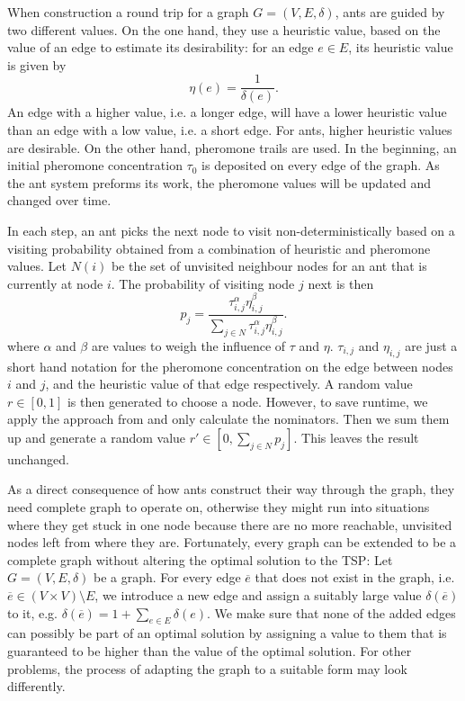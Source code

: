When construction a round trip for a graph $G = \left( V, E, \delta \right)$, ants are guided by two different values. On the one hand, they use a heuristic value, based on the value of an edge to estimate its desirability: for an edge $e \in E$, its heuristic value is given by
\begin{equation}
  \label{eqn:eta}
  \eta \left( e \right) = \frac{1}{\delta \left( e \right)}.
\end{equation}
An edge with a higher value, i.e. a longer edge, will have a lower heuristic value than an edge with a low value, i.e. a short edge. For ants, higher heuristic values are desirable. On the other hand, pheromone trails are used. In the beginning, an initial pheromone concentration $\tau_0$ is deposited on every edge of the graph. As the ant system preforms its work, the pheromone values will be updated and changed over time.

In each step, an ant picks the next node to visit non-deterministically based on a visiting probability obtained from a combination of heuristic and pheromone values. Let $N \left( i \right)$ be the set of unvisited neighbour nodes for an ant that is currently at node $i$. The probability of visiting node $j$ next is then
\begin{equation}
  \label{eqn:probability}
  p_j = \frac{\tau_{i,j}^\alpha \eta_{i,j}^\beta}{\sum_{j \in N} \tau_{i,j}^\alpha \eta_{i,j}^\beta}.
\end{equation}
where $\alpha$ and $\beta$ are values to weigh the influence of $\tau$ and $\eta$. $\tau_{i,j}$ and $\eta_{i,j}$ are just a short hand notation for the pheromone concentration on the edge between nodes $i$ and $j$, and the heuristic value of that edge respectively. A random value $r \in \left[0, 1 \right]$ is then generated to choose a node. However, to save runtime, we apply the approach from \cite{Bloecker} and only calculate the nominators. Then we sum them up and generate a random value $r' \in \left[0, \sum_{j \in N} p_j \right]$. This leaves the result unchanged.

As a direct consequence of how ants construct their way through the graph, they need complete graph to operate on, otherwise they might run into situations where they get stuck in one node because there are no more reachable, unvisited nodes left from where they are. Fortunately, every graph can be extended to be a complete graph without altering the optimal solution to the \textsc{TSP}: Let $G = \left( V, E, \delta \right)$ be a graph. For every edge $\overline{e}$ that does not exist in the graph, i.e. $\overline{e} \in \left( V \times V \right) \setminus E$, we introduce a new edge and assign a suitably large value $\delta \left( \overline{e} \right)$ to it, e.g. $\delta \left( \overline{e} \right) = 1 + \sum_{e \in E} \delta \left( e \right)$. We make sure that none of the added edges can possibly be part of an optimal solution by assigning a value to them that is guaranteed to be higher than the value of the optimal solution. For other problems, the process of adapting the graph to a suitable form may look differently.

